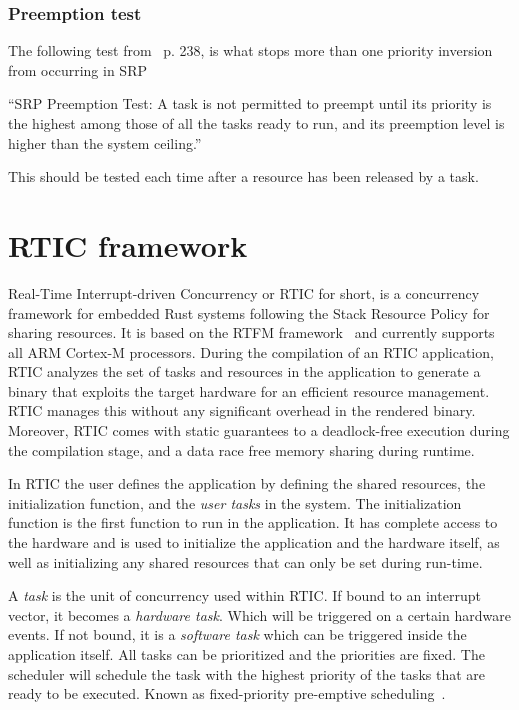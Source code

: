 \subsubsection{Preemption test}
The following test from~\cite{hardrealtimecomputingsystems} p. 238, is what
stops more than one priority inversion from occurring in SRP
\begin{displayquote}
    “SRP Preemption Test: A task is not permitted to preempt until its priority
    is the highest among those of all the tasks ready to run, and its preemption
    level is higher than the system ceiling.”
\end{displayquote}
This should be tested each time after a resource has been released by a task.

\section{RTIC framework}
Real-Time Interrupt-driven Concurrency or RTIC for short, is a concurrency
framework for embedded Rust systems following the Stack Resource Policy for
sharing resources. It is based on the RTFM framework~\cite{rtfm} and currently
supports all ARM Cortex-M processors. During the compilation of an RTIC
application, RTIC analyzes the set of tasks and resources in the application to
generate a binary that exploits the target hardware for an efficient resource
management. RTIC manages this without any significant overhead in the rendered
binary. Moreover, RTIC comes with static guarantees to a deadlock-free
execution during the compilation stage, and a data race free memory sharing
during runtime. 

In RTIC the user defines the application by defining the shared resources, the
initialization function, and the \emph{user tasks} in the system. The
initialization function is the first function to run in the application. It has
complete access to the hardware and is used to initialize the application and
the hardware itself, as well as initializing any shared resources that can only
be set during run-time.

A \emph{task} is the unit of concurrency used within RTIC\@. If bound to an
interrupt vector, it becomes a \emph{hardware task}. Which will be
triggered on a certain hardware events. If not bound, it is a \emph{software
task} which can be triggered inside the application itself. All tasks can
be prioritized and the priorities are fixed. The scheduler will schedule the
task with the highest priority of the tasks that are ready to be executed.
Known as fixed-priority pre-emptive scheduling~\cite{fixedpriorityhistory}.

